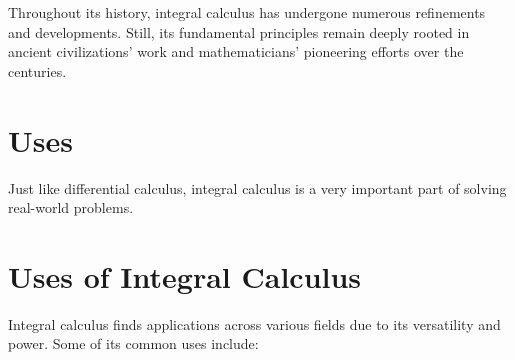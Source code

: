 Throughout its history, integral calculus has undergone numerous refinements and developments. Still, its fundamental principles remain deeply rooted in ancient civilizations' work and mathematicians' pioneering efforts over the centuries.

\section{Uses}

Just like differential calculus, integral calculus is a very important part of solving real-world problems. 

\section*{Uses of Integral Calculus}

Integral calculus finds applications across various fields due to its versatility and power. Some of its common uses include:


